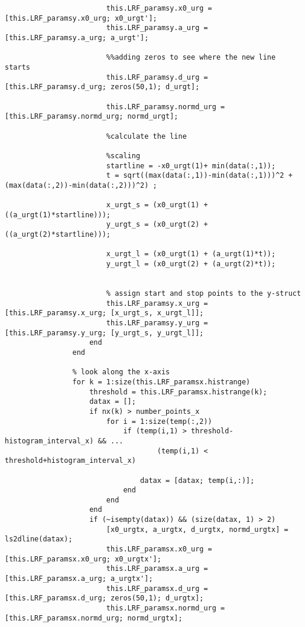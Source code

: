 \begin{lstlisting}
                        this.LRF_paramsy.x0_urg = [this.LRF_paramsy.x0_urg; x0_urgt'];
                        this.LRF_paramsy.a_urg = [this.LRF_paramsy.a_urg; a_urgt'];
                                
                        %%adding zeros to see where the new line starts
                        this.LRF_paramsy.d_urg = [this.LRF_paramsy.d_urg; zeros(50,1); d_urgt];
                        
                        this.LRF_paramsy.normd_urg =[this.LRF_paramsy.normd_urg; normd_urgt];
                        
                        %calculate the line
                        
                        %scaling
                        startline = -x0_urgt(1)+ min(data(:,1));
                        t = sqrt((max(data(:,1))-min(data(:,1)))^2 + (max(data(:,2))-min(data(:,2)))^2) ;
                        
                        x_urgt_s = (x0_urgt(1) + ((a_urgt(1)*startline)));
                        y_urgt_s = (x0_urgt(2) + ((a_urgt(2)*startline)));
                        
                        x_urgt_l = (x0_urgt(1) + (a_urgt(1)*t));
                        y_urgt_l = (x0_urgt(2) + (a_urgt(2)*t));
                        
                        
                        % assign start and stop points to the y-struct
                        this.LRF_paramsy.x_urg = [this.LRF_paramsy.x_urg; [x_urgt_s, x_urgt_l]];
                        this.LRF_paramsy.y_urg = [this.LRF_paramsy.y_urg; [y_urgt_s, y_urgt_l]];
                    end
                end
                
                % look along the x-axis
                for k = 1:size(this.LRF_paramsx.histrange)
                    threshold = this.LRF_paramsx.histrange(k);
                    datax = [];
                    if nx(k) > number_points_x
                        for i = 1:size(temp(:,2))
                            if (temp(i,1) > threshold-histogram_interval_x) && ...
                                    (temp(i,1) < threshold+histogram_interval_x)
                                
                                datax = [datax; temp(i,:)];
                            end
                        end
                    end
                    if (~isempty(datax)) && (size(datax, 1) > 2)
                        [x0_urgtx, a_urgtx, d_urgtx, normd_urgtx] = ls2dline(datax);
                        this.LRF_paramsx.x0_urg = [this.LRF_paramsx.x0_urg; x0_urgtx'];
                        this.LRF_paramsx.a_urg = [this.LRF_paramsx.a_urg; a_urgtx'];
                        this.LRF_paramsx.d_urg = [this.LRF_paramsx.d_urg; zeros(50,1); d_urgtx];
                        this.LRF_paramsx.normd_urg =[this.LRF_paramsx.normd_urg; normd_urgtx];
                        

\end{lstlisting}
